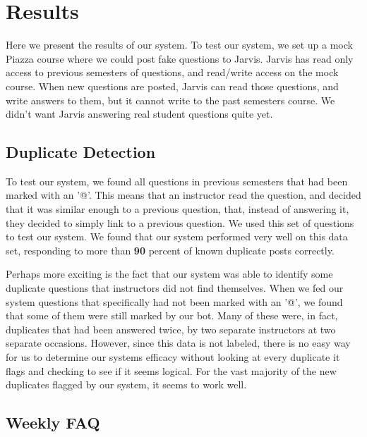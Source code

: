 \documentclass[sigconf]{acmart}
\begin{document}
\section{Results}
Here we present the results of our system.
To test our system, we set up a mock Piazza course where we could post fake questions to Jarvis. Jarvis has read only access to previous semesters of questions, and read/write access on the mock course. When new questions are posted, Jarvis can read those questions, and write answers to them, but it cannot write to the past semesters course. We didn't want Jarvis answering real student questions quite yet.	

\subsection{Duplicate Detection}
To test our system, we found all questions in previous semesters that had been marked with an '@'. This means that an instructor read the question, and decided that it was similar enough to a previous question, that, instead of answering it, they decided to simply link to a previous question. We used this set of questions to test our system. We found that our system performed very well on this data set, responding to more than \textbf{90} percent of known duplicate posts correctly.

Perhaps more exciting is the fact that our system was able to identify some duplicate questions that instructors did not find themselves. When we fed our system questions that specifically had not been marked with an '@', we found that some of them were still marked by our bot. Many of these were, in fact, duplicates that had been answered twice, by two separate instructors at two separate occasions. However, since this data is not labeled, there is no easy way for us to determine our systems efficacy without looking at every duplicate it flags and checking to see if it seems logical. For the vast majority of the new duplicates flagged by our system, it seems to work well.

\subsection{Weekly FAQ}
\end{document}
